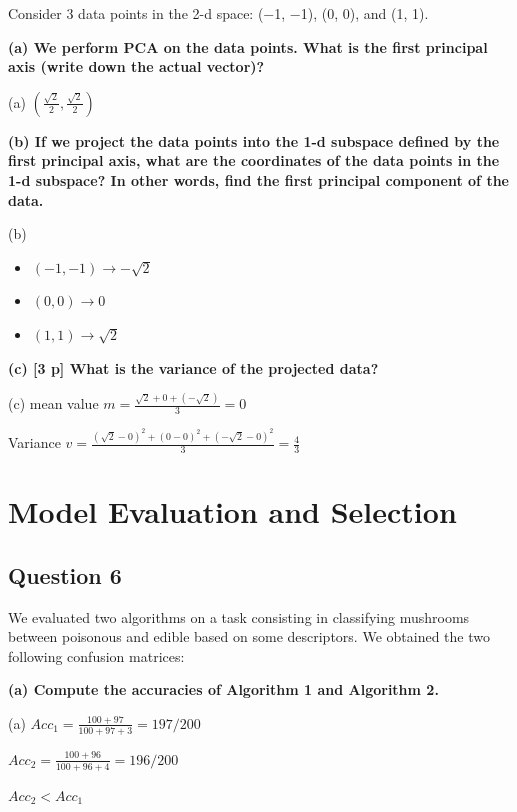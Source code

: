 \documentclass{article}
\begin{document}
Consider 3 data points in the 2-d space: (−1, −1), (0, 0), and (1, 1).

\vspace{1em}

{\bf (a) We perform PCA on the data points. What is the first principal axis (write down the actual vector)?}

(a) $(\frac{\sqrt{2}}{2},\frac{\sqrt{2}}{2})$


\vspace{1em}
{\bf (b) If we project the data points into the 1-d subspace defined by the first principal axis, what are the coordinates of the data points in the 1-d subspace? In other words, find the first principal component of the data.}

(b)

\begin{itemize}
	\item $(-1,-1) \rightarrow -\sqrt2 $
	\item $(0,0) \rightarrow 0 $
	\item $(1,1) \rightarrow \sqrt2 $
\end{itemize}

\vspace{1em}
{\bf (c) [3 p] What is the variance of the projected data?}

(c) mean value ${\displaystyle m=\frac{\sqrt2+0+(-\sqrt2)}{3}=0}$

Variance ${\displaystyle v = \frac{(\sqrt2-0)^2 + (0-0)^2+ (-\sqrt2-0)^2}{3} = \frac{4}{3}}$




\newpage
\section{Model Evaluation and Selection}
\subsection{Question 6}

We evaluated two algorithms on a task consisting in classifying mushrooms between poisonous and edible based on some descriptors. We obtained the two following confusion matrices:

{\bf (a) Compute the accuracies of Algorithm 1 and Algorithm 2.}

(a) ${\displaystyle Acc_1 = \frac{100+97}{100+97+3}=197/200}$ 

${\displaystyle Acc_2 = \frac{100+96}{100+96+4}=196/200}$ 

$Acc_2 < Acc_1$
\end{document}
